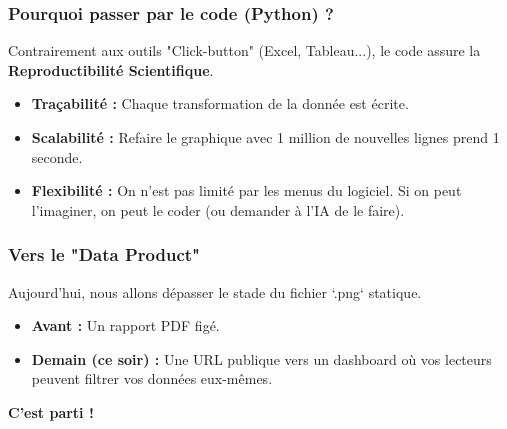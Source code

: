 \begin{frame}\frametitle{Pourquoi passer par le code (Python) ?}
   Contrairement aux outils "Click-button" (Excel, Tableau...), le code assure la \textbf{Reproductibilité Scientifique}.

   \begin{itemize}
      \item \textbf{Traçabilité :} Chaque transformation de la donnée est écrite.
      \item \textbf{Scalabilité :} Refaire le graphique avec 1 million de nouvelles lignes prend 1 seconde.
      \item \textbf{Flexibilité :} On n'est pas limité par les menus du logiciel. Si on peut l'imaginer, on peut le coder (ou demander à l'IA de le faire).
   \end{itemize}
\end{frame}


\begin{frame}\frametitle{Vers le "Data Product"}
   Aujourd'hui, nous allons dépasser le stade du fichier `.png` statique.

   \begin{itemize}
      \item \textbf{Avant :} Un rapport PDF figé.
      \item \textbf{Demain (ce soir) :} Une URL publique vers un dashboard où vos lecteurs peuvent filtrer vos données eux-mêmes.
   \end{itemize}

   \begin{center}
       \textbf{C'est parti !}
   \end{center}
\end{frame}

